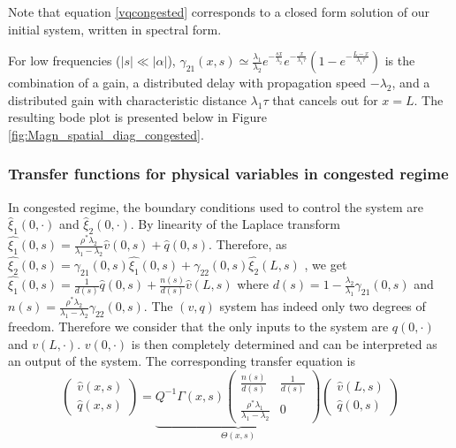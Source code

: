 \documentclass[preprint]{elsarticle}
\begin{document}
Note that equation \eqref{vqcongested} corresponds to a closed form solution of our initial system, written in spectral form.

For low frequencies ($\left|s\right|\ll\left|\alpha\right|$), 
$\gamma_{21}\left(x,s\right)
\simeq
\frac{\lambda_{1}}{\lambda_{2}}
e^{-\frac{sx}{\lambda_{2}}}
e^{-\frac{x}{\lambda_{1}\tau}}
\left(
	1 -
	e^{-\frac{L-x}{\lambda_{1}\tau}}
\right)
$
is the combination of a gain, a distributed delay with propagation speed $-\lambda_{2}$, and a distributed gain with characteristic distance $\lambda_{1}\tau$ that cancels out for $x = L$. The resulting bode plot is presented below in Figure \ref{fig:Magn_spatial_diag_congested}.

\subsubsection{Transfer functions for physical variables in congested regime}
In congested regime, the boundary conditions used to control the system are $\hat{\xi}_{1}\left(0,\cdot\right)$ and $\hat{\xi}_{2}\left(0,\cdot\right)$. By linearity of the Laplace transform 
$\hat{\xi_{1}}\left(0,s\right) = 
\frac{
	\rho^{*}\lambda_{2}
}{
	\lambda_{1} - \lambda_{2}
} 
\hat{v}\left(0,s\right)
+
\hat{q}\left(0,s\right)
$.
Therefore, as
$\hat{\xi_{2}}\left(0,s\right) =
\gamma_{21}\left(0,s\right)
\hat{\xi_{1}}\left(0,s\right)
+
\gamma_{22}\left(0,s\right)
\hat{\xi_{2}}\left(L,s\right)$
, we get
$\hat{\xi_{1}}\left(0,s\right) =
\frac{1}{d\left(s\right)}
\hat{q}\left(0,s\right)
+
\frac{n\left(s\right)}{d\left(s\right)}
\hat{v}\left(L,s\right)
$
where
$d\left(s\right) = 1 - \frac{\lambda_{2}}{\lambda_{1}}\gamma_{21}\left(0,s\right)$
and
$n\left(s\right) = \frac{\rho^{*} \lambda_{2}}{\lambda_{1} - \lambda_{2}} \gamma_{22}\left(0,s\right)$. The $\left(v,q\right)$ system has indeed only two degrees of freedom. Therefore we consider that the only inputs to the system are $q\left(0,\cdot\right)$ and $v\left(L,\cdot\right)$. $v\left(0,\cdot\right)$ is then completely determined and can be interpreted as an output of the system.
The corresponding transfer equation is
\begin{equation}
\begin{pmatrix}
	\hat{v}\left(x,s\right)
	\\
	\hat{q}\left(x,s\right)
\end{pmatrix}
=
\underset{\Theta\left(x,s\right)}{
\underbrace{
Q^{-1}\Gamma\left(x,s\right)
\begin{pmatrix}
	\frac{n\left(s\right)}{d\left(s\right)}
		&
	\frac{1}{d\left(s\right)}	
	\\
	\frac{\rho^{*}\lambda_{1}}{\lambda_{1} - \lambda_{2}}
		&
	0
\end{pmatrix}
}
}
\begin{pmatrix}
	\hat{v}\left(L,s\right)
	\\
	\hat{q}\left(0,s\right)
\end{pmatrix}
\end{equation}
\end{document}
